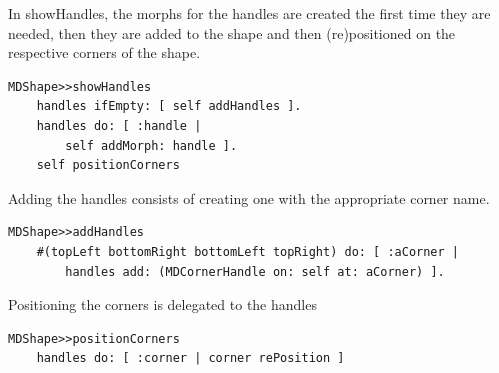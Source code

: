 \documentclass[10pt]{article}   	%
\begin{document}
In showHandles, the morphs for the handles
are created the first time they are needed, then they are 
added to the shape and then (re)positioned on the respective
corners of the shape.
\begin{verbatim} 
MDShape>>showHandles
    handles ifEmpty: [ self addHandles ].
    handles do: [ :handle |
        self addMorph: handle ].
    self positionCorners
\end{verbatim}
Adding the handles consists of creating one with the
appropriate corner name.
\begin{verbatim}
MDShape>>addHandles
    #(topLeft bottomRight bottomLeft topRight) do: [ :aCorner | 
        handles add: (MDCornerHandle on: self at: aCorner) ].
\end{verbatim}
Positioning the corners is delegated to the handles
\begin{verbatim}
MDShape>>positionCorners
    handles do: [ :corner | corner rePosition ]
\end{verbatim}
\end{document}
